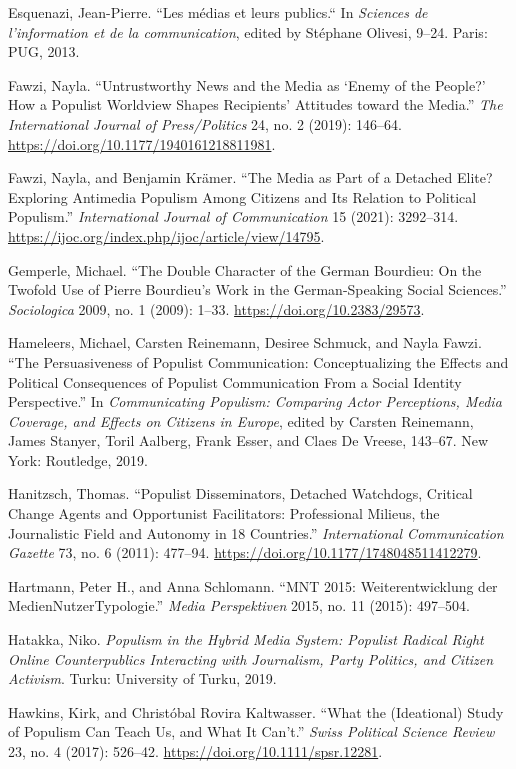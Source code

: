 \documentclass{tufte-handout}
\begin{document}
\begin{hangparas}{.25in}{1}
Esquenazi, Jean-Pierre. ``Les médias et leurs publics.`` In
\emph{Sciences de l'information et de la communication}, edited by
Stéphane Olivesi, 9--24. Paris: PUG, 2013.

Fawzi, Nayla. ``Untrustworthy News and the Media as `Enemy of the
People?' How a Populist Worldview Shapes Recipients' Attitudes toward
the Media.'' \emph{The International Journal of Press/Politics} 24, no.
2 (2019): 146--64. \url{https://doi.org/10.1177/1940161218811981}.

Fawzi, Nayla, and Benjamin Krämer. ``The Media as Part of a Detached
Elite? Exploring Antimedia Populism Among Citizens and Its Relation to
Political Populism.'' \emph{International Journal of Communication} 15
(2021): 3292--314.
\url{https://ijoc.org/index.php/ijoc/article/view/14795}.

Gemperle, Michael. ``The Double Character of the German Bourdieu: On the
Twofold Use of Pierre Bourdieu's Work in the German-Speaking Social
Sciences.'' \emph{Sociologica} 2009, no. 1 (2009): 1--33.
\url{https://doi.org/10.2383/29573}.

Hameleers, Michael, Carsten Reinemann, Desiree Schmuck, and Nayla Fawzi.
``The Persuasiveness of Populist Communication: Conceptualizing the
Effects and Political Consequences of Populist Communication From a
Social Identity Perspective.'' In \emph{Communicating Populism:
Comparing Actor Perceptions, Media Coverage, and Effects on Citizens in
Europe}, edited by Carsten Reinemann, James Stanyer, Toril Aalberg,
Frank Esser, and Claes De Vreese, 143--67. New York: Routledge, 2019.

Hanitzsch, Thomas. ``Populist Disseminators, Detached Watchdogs,
Critical Change Agents and Opportunist Facilitators: Professional
Milieus, the Journalistic Field and Autonomy in 18 Countries.''
\emph{International Communication Gazette} 73, no. 6 (2011): 477--94.
\url{https://doi.org/10.1177/1748048511412279}.

Hartmann, Peter H., and Anna Schlomann. ``MNT 2015: Weiterentwicklung
der MedienNutzerTypologie.'' \emph{Media Perspektiven} 2015, no. 11
(2015): 497--504.

Hatakka, Niko. \emph{Populism in the Hybrid Media System: Populist
Radical Right Online Counterpublics Interacting with Journalism, Party
Politics, and Citizen Activism}. Turku: University of Turku, 2019.

Hawkins, Kirk, and Christóbal Rovira Kaltwasser. ``What the (Ideational)
Study of Populism Can Teach Us, and What It Can't.'' \emph{Swiss
Political Science Review} 23, no. 4 (2017): 526--42.
\url{https://doi.org/10.1111/spsr.12281}.


\end{hangparas}
\end{document}
